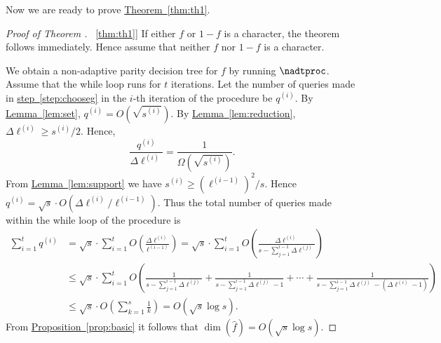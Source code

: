 \documentclass[11pt]{article}
\numberwithin{equation}{section}
\theoremstyle{definition}
\theoremstyle{plain}
\DeclareMathOperator{\dimn}{dim}
\newcommand{\lref}[2][]{\hyperref[#2]{#1~\ref*{#2}}}
\begin{document}
Now we are ready to prove \lref[Theorem]{thm:th1}.
\begin{proof}[Proof of Theorem \lref{thm:th1}]
If either $f$ or $1-f$ is a character, the theorem follows immediately. Hence assume that neither $f$ nor $1-f$ is a character.

We obtain a non-adaptive parity decision tree for $f$ by running $\nadtproc$. Assume that the while loop runs for $t$ iterations.
Let the number of queries made in \lref[step]{step:chooseg} in the $i$-th iteration
of the procedure be $q^{(i)}$. By \lref[Lemma]{lem:set}, $q^{(i)} = O(\sqrt {s^{(i)}})$. By \lref[Lemma]{lem:reduction}, $\Delta \ell^{(i)} \geq {s^{(i)}}/{2}$.
Hence,
\[
  \frac {q^{(i)}}{\Delta \ell^{(i)}}=\frac{1}{\Omega(\sqrt{s^{(i)}})}.
\]
{}From \lref[Lemma]{lem:support} we have
$s^{(i)} \geq \left(\ell^{(i-1)}\right)^2/s$. Hence
$q^{(i)}=\sqrt{s} \cdot O\left(\Delta \ell^{(i)}/\ell^{(i-1)}
\right)$. Thus the total number of queries made within the while loop
of the procedure is
\begin{align}
\label{count}
 \displaystyle\sum_{i=1}^t q^{(i)} &= \sqrt{s} \cdot \displaystyle\sum_{i=1}^t O\left(\frac{\Delta \ell^{(i)}}{\ell^{(i-1)}}\right) \nonumber 
                                           = \sqrt{s} \cdot \displaystyle\sum_{i=1}^t O\left(\frac{\Delta \ell^{(i)}}{s - \displaystyle\sum_{j=1}^{i-1} \Delta \ell^{(j)}}\right) \nonumber \\
					  & \leq \sqrt{s} \cdot \displaystyle\sum_{i=1}^t O \left(  \frac{1}{s - \displaystyle\sum_{j=1}^{i-1} \Delta \ell^{(j)}} + \frac{1}{s - \displaystyle\sum_{j=1}^{i-1} \Delta \ell^{(j)}-1} 
+\cdots+  \frac{1}{s - \displaystyle\sum_{j=1}^{i-1} \Delta \ell^{(j)}-(\Delta \ell^{(i)}-1)} \right) \nonumber \\
					  &\leq \sqrt{s} \cdot \displaystyle O\left(\sum_{k=1}^s \frac{1}{k}\right) = O(\sqrt{s} \log s). \nonumber
\end{align}
{}From \lref[Proposition]{prop:basic} it follows that
$\dimn(\widehat{f}) = O(\sqrt{s} \log s)$.
\end{proof}
\end{document}
